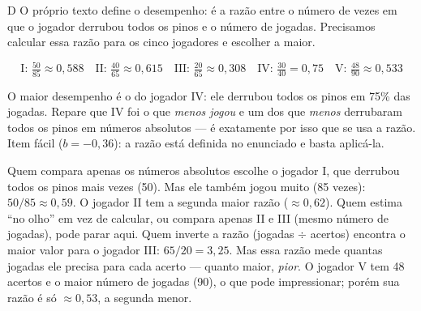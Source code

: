 \secaoenem

\begin{resolucao}{D}
 O próprio texto define o desempenho: é a razão
entre o número de vezes em que o jogador derrubou todos os pinos e o número de
jogadas. Precisamos calcular essa razão para os cinco jogadores e escolher a maior.

\[
\text{I: } \tfrac{50}{85} \approx 0{,}588 \quad
\text{II: } \tfrac{40}{65} \approx 0{,}615 \quad
\text{III: } \tfrac{20}{65} \approx 0{,}308 \quad
\text{IV: } \tfrac{30}{40} = 0{,}75 \quad
\text{V: } \tfrac{48}{90} \approx 0{,}533
\]

 O maior desempenho é o do jogador IV: ele derrubou todos os
pinos em 75\% das jogadas. Repare que IV foi o que \emph{menos jogou} e um dos que
\emph{menos} derrubaram todos os pinos em números absolutos — é exatamente por isso
que se usa a razão. Item fácil ($b = -0{,}36$): a razão está definida no
enunciado e basta aplicá-la.
\begin{distratores}
 Quem compara apenas os números absolutos escolhe o jogador I, que derrubou
todos os pinos mais vezes (50). Mas ele também jogou muito (85 vezes): $50/85 \approx 0{,}59$.
 O jogador II tem a segunda maior razão ($\approx 0{,}62$). Quem estima ``no
olho'' em vez de calcular, ou compara apenas II e III (mesmo número de jogadas), pode
parar aqui.
 Quem inverte a razão (jogadas $\div$ acertos) encontra o maior valor para o
jogador III: $65/20 = 3{,}25$. Mas essa razão mede quantas jogadas ele precisa para
cada acerto — quanto maior, \emph{pior}.
 O jogador V tem 48 acertos e o maior número de jogadas (90), o que pode
impressionar; porém sua razão é só $\approx 0{,}53$, a segunda menor.
\end{distratores}
\end{resolucao}

